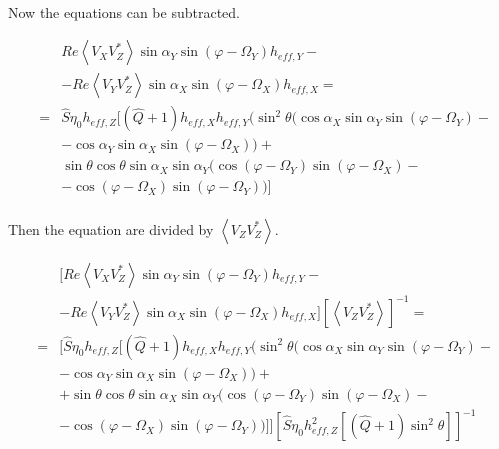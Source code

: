 \documentclass[a4paper,10pt]{thesis}
\begin{document}
\paragraph*{}
Now the equations can be subtracted.

\begin{eqnarray}
&&Re \left\langle V_X V_Z^{*}\right\rangle \sin \alpha_Y  \sin (\varphi - \Omega_Y) h_{eff,Y}
-\nonumber \\
&&- Re \left\langle V_Y V_Z^{*}\right\rangle\sin \alpha_X  \sin (\varphi - \Omega_X) h_{eff,X}= \nonumber\\
&=& \hat{S}\eta_0  h_{eff,Z}[(\hat{Q}+1) h_{eff,X} h_{eff,Y} (  \sin^2 \theta ( \cos \alpha_X  \sin \alpha_Y  \sin (\varphi - \Omega_Y)-\nonumber \\
&& -\cos \alpha_Y \sin \alpha_X  \sin (\varphi - \Omega_X))+\nonumber \\
&& \sin \theta \cos \theta \sin \alpha_X  \sin \alpha_Y ( \cos (\varphi - \Omega_Y)  \sin (\varphi - \Omega_X)-\nonumber \\
&& -\cos (\varphi - \Omega_X)  \sin (\varphi - \Omega_Y)) ]
\end{eqnarray}

\paragraph*{}
Then the equation are divided by $\left\langle V_Z V_Z^{*} \right\rangle$.

\begin{eqnarray}
&&[Re \left\langle V_X V_Z^{*}\right\rangle \sin \alpha_Y  \sin (\varphi - \Omega_Y) h_{eff,Y}-\nonumber \\
&&-Re \left\langle V_Y V_Z^{*}\right\rangle\sin \alpha_X  \sin (\varphi - \Omega_X) h_{eff,X}] \left[ \left\langle V_Z V_Z^{*} \right\rangle \right]^{-1} =\nonumber \\
&=&[\hat{S}\eta_0  h_{eff,Z}[(\hat{Q}+1) h_{eff,X} h_{eff,Y} (  \sin^2 \theta ( \cos \alpha_X  \sin \alpha_Y  \sin (\varphi - \Omega_Y)-\nonumber \\
&& - \cos \alpha_Y \sin \alpha_X  \sin (\varphi - \Omega_X)) +\nonumber \\
&&+ \sin \theta \cos \theta \sin \alpha_X  \sin \alpha_Y ( \cos (\varphi - \Omega_Y)  \sin (\varphi - \Omega_X)-\nonumber \\
&&- \cos (\varphi - \Omega_X)  \sin (\varphi - \Omega_Y)) ]][\hat{S}\eta_0 h_{eff,Z}^2[(\hat{Q}+1) \sin^2 \theta ]]^{-1}
\end{eqnarray}
\end{document}
